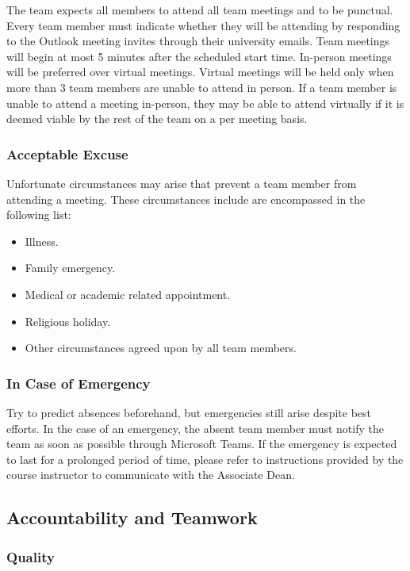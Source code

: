 \documentclass{article}
\begin{document}
The team expects all members to attend all team meetings and to be punctual. Every team member must indicate whether they will be attending 
by responding to the Outlook meeting invites through their university emails. Team meetings 
will begin at most 5 minutes after the scheduled start time. In-person meetings will be preferred over virtual meetings.
Virtual meetings will be held only when more than 3 team members are unable to attend in person. If a team member is unable to 
attend a meeting in-person, they may be able to attend virtually if it is deemed viable by the rest of the team on a per meeting basis.

\subsubsection*{Acceptable Excuse}

Unfortunate circumstances may arise that prevent a team member from attending a meeting.
These circumstances include are encompassed in the following list:
\begin{itemize}
  \item Illness.
  \item Family emergency.
  \item Medical or academic related appointment.
  \item Religious holiday.
  \item Other circumstances agreed upon by all team members.
\end{itemize}

\subsubsection*{In Case of Emergency}

Try to predict absences beforehand, but emergencies still arise despite best efforts.
In the case of an emergency, the absent team member must notify the team as soon as possible through Microsoft Teams.
If the emergency is expected to last for a prolonged period of time, please refer to instructions provided by the course instructor 
to communicate with the Associate Dean.

\subsection*{Accountability and Teamwork}

\subsubsection*{Quality} 
\end{document}
